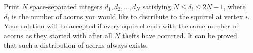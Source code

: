 
Print $N$ space-separated integers $d_1, d_2, \ldots, d_N$ satisfying $N \leq d_i \leq 2N-1$, where $d_i$ is the number of acorns you would like to distribute to the squirrel at vertex $i$. Your solution will be accepted if every squirrel ends with the same number of acorns as they started with after all $N$ thefts have occurred. It can be proved that such a distribution of acorns always exists.